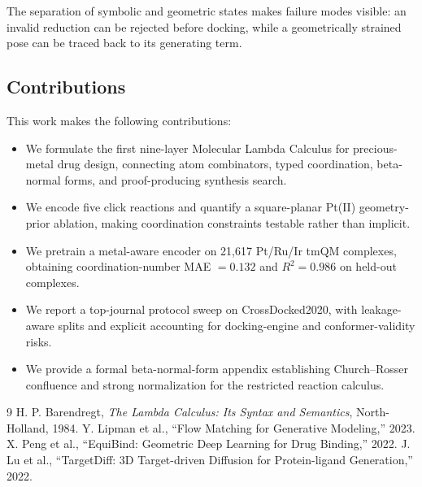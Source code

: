 \documentclass[10pt]{article}
\begin{document}
The separation of symbolic and geometric states makes failure modes visible: an invalid reduction can be rejected before docking, while a geometrically strained pose can be traced back to its generating term.

\subsection{Contributions}

This work makes the following contributions:

\begin{itemize}[leftmargin=*]
    \item We formulate the first nine-layer Molecular Lambda Calculus for precious-metal drug design, connecting atom combinators, typed coordination, beta-normal forms, and proof-producing synthesis search.
    \item We encode five click reactions and quantify a square-planar Pt(II) geometry-prior ablation, making coordination constraints testable rather than implicit.
    \item We pretrain a metal-aware encoder on 21,617 Pt/Ru/Ir tmQM complexes, obtaining coordination-number MAE $=0.132$ and $R^2=0.986$ on held-out complexes.
    \item We report a top-journal protocol sweep on CrossDocked2020, with leakage-aware splits and explicit accounting for docking-engine and conformer-validity risks.
    \item We provide a formal beta-normal-form appendix establishing Church--Rosser confluence and strong normalization for the restricted reaction calculus.
\end{itemize}

\begin{thebibliography}{9}
 H. P. Barendregt, \emph{The Lambda Calculus: Its Syntax and Semantics}, North-Holland, 1984.
 Y. Lipman et al., ``Flow Matching for Generative Modeling,'' 2023.
 X. Peng et al., ``EquiBind: Geometric Deep Learning for Drug Binding,'' 2022.
 J. Lu et al., ``TargetDiff: 3D Target-driven Diffusion for Protein-ligand Generation,'' 2022.
\end{thebibliography}
\end{document}
